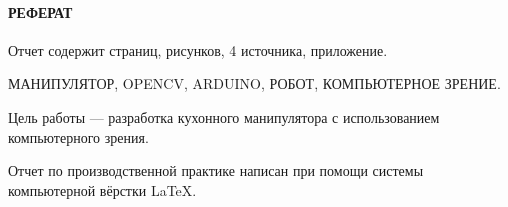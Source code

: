 \newpage
\paragraph{\hfill РЕФЕРАТ \hfill}
Отчет содержит  страниц,  рисунков, 4 источника,  приложение.

МАНИПУЛЯТОР, OPENCV, ARDUINO, РОБОТ, КОМПЬЮТЕРНОЕ ЗРЕНИЕ.

Цель работы --- разработка кухонного манипулятора с использованием компьютерного зрения.

Отчет по производственной практике написан при помощи системы компьютерной вёрстки \LaTeX.
